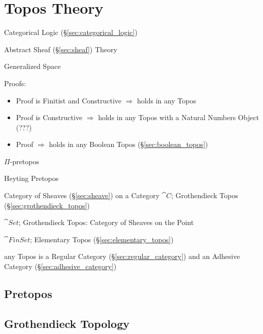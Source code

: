 \section{Topos Theory}\label{sec:topos_theory}

Categorical Logic (\S\ref{sec:categorical_logic})

Abstract Sheaf (\S\ref{sec:sheaf}) Theory

Generalized Space

Proofs:
\begin{itemize}
  \item Proof is Finitist and Constructive $\Rightarrow$ holds in any
    Topos
  \item Proof is Constructive $\Rightarrow$ holds in any Topos with a
    Natural Numbers Object (???)
  \item Proof $\Rightarrow$ holds in any Boolean Topos
    (\S\ref{sec:boolean_topos})
\end{itemize}

$\Pi$-pretopos

Heyting Pretopos

Category of Sheaves (\S\ref{sec:sheave}) on a Category $\cat{C}$;
Grothendieck Topos (\S\ref{sec:grothendieck_topos})

$\cat{Set}$; Grothendieck Topos: Category of Sheaves on the Point

$\cat{FinSet}$; Elementary Topos (\S\ref{sec:elementary_topos})

any Topos is a Regular Category (\S\ref{sec:regular_category}) and an
Adhesive Category (\S\ref{sec:adhesive_category})



\subsection{Pretopos}\label{sec:pretopos}

\subsection{Grothendieck Topology}\label{sec:grothendieck_topology}

